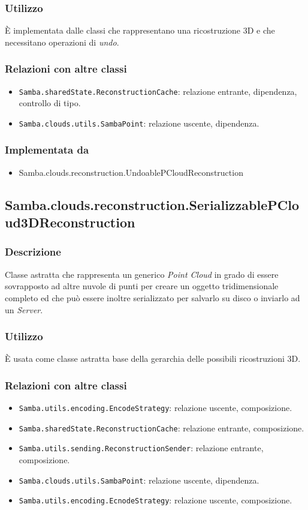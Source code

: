 \subsubsection{Utilizzo}
È implementata dalle classi che rappresentano una ricostruzione 3D e che necessitano operazioni di \emph{undo}.
\subsubsection{Relazioni con altre classi}
\begin{itemize}
	\item \texttt{Samba.sharedState.ReconstructionCache}: relazione entrante, dipendenza, controllo di tipo.
	\item \texttt{Samba.clouds.utils.SambaPoint}: relazione uscente, dipendenza.
\end{itemize}
\subsubsection{Implementata da}
\begin{itemize}
	\item Samba.clouds.reconstruction.UndoablePCloudReconstruction
\end{itemize}


\subsection{Samba.clouds.reconstruction.SerializzablePCloud3DReconstruction}
\subsubsection{Descrizione}
Classe astratta che rappresenta un generico \emph{Point Cloud} in grado di essere sovrapposto ad altre nuvole di punti per creare un oggetto tridimensionale completo ed che può essere inoltre serializzato per salvarlo su disco o inviarlo ad un \emph{Server}.
\subsubsection{Utilizzo}
È usata come classe astratta base della gerarchia delle possibili ricostruzioni 3D.
\subsubsection{Relazioni con altre classi}
\begin{itemize}
	\item \texttt{Samba.utils.encoding.EncodeStrategy}: relazione uscente, composizione.
	\item \texttt{Samba.sharedState.ReconstructionCache}: relazione entrante, composizione.
	\item \texttt{Samba.utils.sending.ReconstructionSender}: relazione entrante, composizione.
	\item \texttt{Samba.clouds.utils.SambaPoint}: relazione uscente, dipendenza.
	\item \texttt{Samba.utils.encoding.EcnodeStrategy}: relazione uscente, composizione.
\end{itemize}
